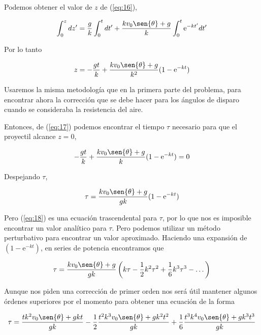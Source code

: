 \documentclass[a4paper,10pt]{article}
\numberwithin{equation}{section}
\newcommand{\euler}{\mathrm{e}}
\begin{document}
Podemos obtener el valor de $z$ de (\ref{eq:16}),

\begin{equation}
 \int_0^z dz' = \frac{g}{k} \int_0^t dt' + \frac{k v_0 \sen{\theta}+g}{k} \int_0^t \euler^{-kt'}dt'
\end{equation}

Por lo tanto

\begin{equation}
 z = - \frac{gt}{k}+ \frac{k v_0 \sen{\theta}+g}{k^2}(1-\euler^{-kt})
 \label{eq:17}
\end{equation}

Usaremos la misma metodología que en la primera parte del problema,
para encontrar ahora la corrección que se debe hacer para los ángulos
de disparo cuando se consideraba la resistencia del aire.

\vspace{.3cm}

Entonces, de (\ref{eq:17}) podemos encontrar el tiempo $\tau$ necesario
para que el proyectil alcance $z=0$,

\begin{equation}
 - \frac{gt}{k}+ \frac{k v_0 \sen{\theta}+g}{k}(1-\euler^{-kt}) = 0
\end{equation}

Despejando $\tau$, 

\begin{equation}
 \tau = \frac{k v_0 \sen{\theta}+g}{gk}(1-\euler^{-kt})
 \label{eq:18}
\end{equation}

Pero (\ref{eq:18}) es una ecuación trascendental para $\tau$, por lo 
que nos es imposible encontrar un valor analítico para $\tau$. Pero
podemos utilizar un método perturbativo para encontrar un valor aproximado.
Haciendo una expansión de $(1-\euler^{-kt})$, en series de potencia encontramos que

\begin{equation}
 \tau = \frac{k v_0 \sen{\theta}+g}{gk}\left(k\tau - \frac{1}{2}k^2\tau^2
 +\frac{1}{6}k^3\tau^3 - \dots \right)
\end{equation}

Aunque nos piden una corrección de primer orden nos será útil mantener
algunos órdenes superiores por el momento para obtener una ecuación de la 
forma

\begin{equation}
 \tau = \frac{tk^2 v_0 \sen{\theta}+gkt}{gk} - \frac{1}{2} \frac{t^2k^3 v_0 \sen{\theta}+gk^2t^2}{gk} + 
 \frac{1}{6} \frac{t^3k^4 v_0 \sen{\theta}+gk^3t^3}{gk}
\end{equation}
\end{document}
